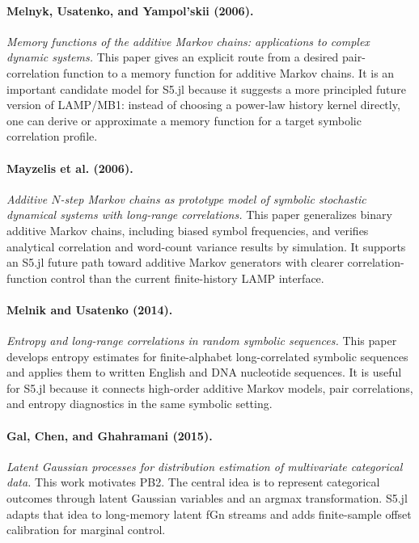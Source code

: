 \documentclass[11pt]{article}
\begin{document}
\paragraph{Melnyk, Usatenko, and Yampol'skii (2006).}
\emph{Memory functions of the additive Markov chains: applications to complex
dynamic systems.}
This paper gives an explicit route from a desired pair-correlation function to a
memory function for additive Markov chains. It is an important candidate model
for S5.jl because it suggests a more principled future version of LAMP/MB1:
instead of choosing a power-law history kernel directly, one can derive or
approximate a memory function for a target symbolic correlation profile.

\paragraph{Mayzelis et al. (2006).}
\emph{Additive $N$-step Markov chains as prototype model of symbolic stochastic
dynamical systems with long-range correlations.}
This paper generalizes binary additive Markov chains, including biased symbol
frequencies, and verifies analytical correlation and word-count variance results
by simulation. It supports an S5.jl future path toward additive Markov generators
with clearer correlation-function control than the current finite-history LAMP
interface.

\paragraph{Melnik and Usatenko (2014).}
\emph{Entropy and long-range correlations in random symbolic sequences.}
This paper develops entropy estimates for finite-alphabet long-correlated
symbolic sequences and applies them to written English and DNA nucleotide
sequences. It is useful for S5.jl because it connects high-order additive Markov
models, pair correlations, and entropy diagnostics in the same symbolic setting.

\paragraph{Gal, Chen, and Ghahramani (2015).}
\emph{Latent Gaussian processes for distribution estimation of multivariate
categorical data.}
This work motivates PB2. The central idea is to represent categorical outcomes
through latent Gaussian variables and an argmax transformation. S5.jl adapts that
idea to long-memory latent fGn streams and adds finite-sample offset calibration
for marginal control.
\end{document}
